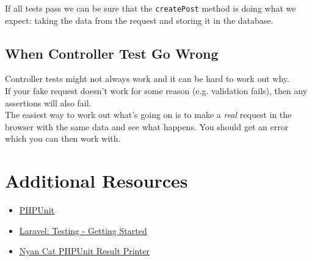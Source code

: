 If all tests pass we can be sure that the \texttt{createPost} method is doing what we expect: taking the data from the request and storing it in the database.

\subsection{When Controller Test Go Wrong}

Controller tests might not always work and it can be hard to work out why.
\\

If your fake request doesn't work for some reason (e.g. validation fails), then any assertions will also fail.
\\

The easiest way to work out what's going on is to make a \textit{real} request in the browser with the same data and see what happens. You should get an error which you can then work with.



\section{Additional Resources}

\begin{itemize}[leftmargin=*]
    \item \href{https://github.com/sebastianbergmann/phpunit}{PHPUnit}
    \item \href{http://laravel.com/docs/6.x/testing}{Laravel: Testing - Getting Started}
    \item \href{https://github.com/JeroenDeDauw/nyancat-phpunit-resultprinter}{Nyan Cat PHPUnit Result Printer}
\end{itemize}
